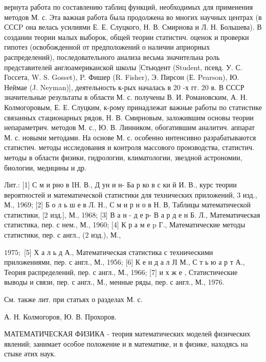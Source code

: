 \documentclass[10pt]{article}
\begin{document}
вернута работа по составлению таблиц функций, необходимых для применения методов М. с. Эта важная работа была продолжена во многих научных центрах (в СССP она велась усилиями Е. Е. Слуцкого, Н. В. Смирнова и Л. Н. Большева). В создании теории малых выборок, общей теории статистич. оценок и проверки гипотез (освобожденной от предположений о наличии априорных распределений), последовательного анализа весьма значительна роль представителей англоамериканской школы [Стьюдент (Student, псевд. У. С. Госсета, W. S. Gosset), P. Фишер (R. Fisher), Э. Пирсон (Е. Pearson), Ю. Неймае (J. Neyman)], деятельность к-рых началась в 20 -х гг. 20 в. В СССР значительные результаты в области М. с. получены В. И. Романовским, А. Н. Колмогоровым, Е. Е. Слуцким, к-рому принадлежат важные работы по статистике связанных стационарных рядов, Н. В. Смирновым, заложившим основы теории непараметрич. методов М. с., Ю. В. Линником, обогатившим аналитич. аппарат М. с. новыми методами. На основе М. с. особенно интенсивно разрабатываются статистич. методы исследования и контроля массового производства, статистич. методы в области физики, гидрологии, климатологии, звездной астрономии, биологии, медицины и др.



Лит.: [1] С м и рно в IН. В., Д ун и н- Ба р ко в с ки й И. В., курс теории вероятностей и математической статистики для технических приложений, 3 изд., М., 1969; [2] Б о л ь ш е в Л. Н., С м и р н о в Н. В, Таблицы математической статистики, [2 изд.], М., 1968; [3] В а н - д е р- В а р д е н Б. Л., Математическая статистика, пер. с нем., М., 1960; [4] К р а м е p Г., Математические методы статистики, пер. с англ., (2 изд.), М.,

$1975 ;$ [5] Х а л ь д А., Математическая статистика с техническими приложениями, пер. с англ., М., 1956; [6] К е н д а л ЈI М., С т ь ю а р т А., Теория распределений, пер. с англ., М., 1966; [7] и х ж е , Статистические выводы и связи, пер. с англ., М., менные ряды, пер. с англ., М., 1976.



См. также лит. при статьях о разделах М. с.



А. Н. Колмогоров, Ю. В. Прохоров.



МАТЕМАТИЧЕСКАЯ ФИЗИКА - теория математических моделей физических явлений; занимает особое положение и в математике, и в физике, находясь на стыке әтих наук.
\end{document}
